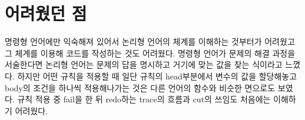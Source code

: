 \documentclass{oblivoir}
\begin{document}
\section{어려웠던 점}
명령형 언어에만 익숙해져 있어서 논리형 언어의 체계를 이해하는 것부터가 어려웠고 그 체계를 이용해 코드를 작성하는 것도 어려웠다. 명령형 언어가 문제의 해결 과정을 서술한다면 논리형 언어는 문제의 답을 명시하고 거기에 맞는 값을 찾는 식이라고 느꼈다. 하지만 어떤 규칙을 적용할 때 일단 규칙의 head부분에서 변수의 값을 할당해놓고 body의 조건을 하나씩 적용해나가는 것은 다른 언어의 함수와 비슷한 면으로도 보였다. 규칙 적용 중 fail을 한 뒤 redo하는 trace의 흐름과 cut의 쓰임도 처음에는 이해하기 어려웠다.
\end{document}
